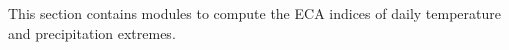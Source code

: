 This section contains modules to compute the ECA indices
of daily temperature and precipitation extremes.

